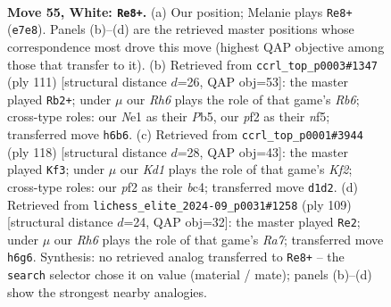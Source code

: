 \documentclass[11pt]{article}
\begin{document}
\clearpage

\begin{figure}[p]\centering
\begin{subfigure}{0.46\textwidth}\centering
\resizebox{\linewidth}{!}{%
\newchessgame
\chessboard[
  setfen={6k1/4R3/7R/2p4P/8/8/1P3p2/3KN2r w - - 11 55},
  showmover=false,
  pgfstyle=straightmove, color=movearrow, markmove={e7-e8}
]}
\caption{}
\end{subfigure}\hfill
\begin{subfigure}{0.46\textwidth}\centering
\resizebox{\linewidth}{!}{%
\newchessgame
\chessboard[
  setfen={8/8/1R2nk2/1p2pN2/4P3/1r6/3K4/8 b - - 5 56},
  showmover=false,
  pgfstyle=straightmove, color=movearrow, markmove={b3-b2}
]}
\caption{}
\end{subfigure}
\\[4pt]
\begin{subfigure}{0.46\textwidth}\centering
\resizebox{\linewidth}{!}{%
\newchessgame
\chessboard[
  setfen={8/7k/6p1/4R3/1Pb5/7P/r3NK2/8 w - - 1 60},
  showmover=false,
  pgfstyle=straightmove, color=movearrow, markmove={f2-f3}
]}
\caption{}
\end{subfigure}\hfill
\begin{subfigure}{0.46\textwidth}\centering
\resizebox{\linewidth}{!}{%
\newchessgame
\chessboard[
  setfen={8/3R4/8/4P3/3n4/p2k1PK1/r7/8 b - - 1 55},
  showmover=false,
  pgfstyle=straightmove, color=movearrow, markmove={a2-e2}
]}
\caption{}
\end{subfigure}
\caption{\textbf{Move 55, White: \texttt{Re8+}.} (a) Our position; Melanie plays \texttt{Re8+} (\texttt{e7e8}). Panels (b)--(d) are the retrieved master positions whose correspondence most drove this move (highest QAP objective among those that transfer to it). (b) Retrieved from \texttt{ccrl\_top\_p0003\#1347} (ply 111) [structural distance $d$=26, QAP obj=53]: the master played \texttt{Rb2+}; under $\mu$ our \emph{Rh6} plays the role of that game's \emph{Rb6}; cross-type roles: our \emph{N}e1 as their \emph{P}b5, our \emph{p}f2 as their \emph{n}f5; transferred move \texttt{h6b6}. (c) Retrieved from \texttt{ccrl\_top\_p0001\#3944} (ply 118) [structural distance $d$=28, QAP obj=43]: the master played \texttt{Kf3}; under $\mu$ our \emph{Kd1} plays the role of that game's \emph{Kf2}; cross-type roles: our \emph{p}f2 as their \emph{b}c4; transferred move \texttt{d1d2}. (d) Retrieved from \texttt{lichess\_elite\_2024-09\_p0031\#1258} (ply 109) [structural distance $d$=24, QAP obj=32]: the master played \texttt{Re2}; under $\mu$ our \emph{Rh6} plays the role of that game's \emph{Ra7}; transferred move \texttt{h6g6}. Synthesis: no retrieved analog transferred to \texttt{Re8+} -- the \texttt{search} selector chose it on value (material / mate); panels (b)--(d) show the strongest nearby analogies.}
\label{fig:thought-m108}
\end{figure}
\end{document}
